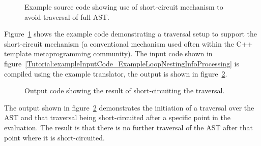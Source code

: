 \begin{figure}[!h]
{\indent
{\mySmallFontSize

\begin{latexonly}
   
\end{latexonly}

\begin{htmlonly}
   
\end{htmlonly}

}
}
\caption{Example source code showing use of short-circuit mechanism to avoid traversal of full AST.}
\label{Tutorial:exampleTraversalShortCircuit}
\end{figure}

Figure~\ref{Tutorial:exampleTraversalShortCircuit} shows the example code demonstrating a
traversal setup to support the short-circuit mechanism (a conventional mechanism used
often within the C++ template metaprogramming community). The input code shown in 
figure~\ref{Tutorial:exampleInputCode_ExampleLoopNestingInfoProcessing}
is compiled using the example translator, the output is shown in 
figure~\ref{Tutorial:exampleOutput_traversalShortCircuit}.

\begin{figure}[!h]
{\indent
{\mySmallFontSize

\begin{latexonly}
   
\end{latexonly}

\begin{htmlonly}
   
\end{htmlonly}

}
}
\caption{Output code showing the result of short-circuiting the traversal.}
\label{Tutorial:exampleOutput_traversalShortCircuit}
\end{figure}

   The output shown in figure~\ref{Tutorial:exampleOutput_traversalShortCircuit}
demonstrates the initiation of a traversal over the AST and that traversal
being short-circuited after a specific point in the evaluation.  The result is
that there is no further traversal of the AST after that point where it is
short-circuited.




